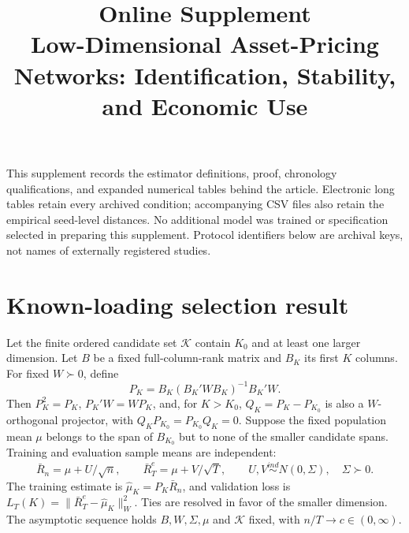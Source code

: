 \documentclass[11pt]{article}
\title{Online Supplement\\[6pt]\large Low-Dimensional Asset-Pricing Networks: Identification, Stability, and Economic Use}
\author{}
\date{}
\begin{document}
\maketitle
\vspace{-2em}
This supplement records the estimator definitions, proof, chronology qualifications, and expanded numerical tables behind the article. Electronic long tables retain every archived condition; accompanying CSV files also retain the empirical seed-level distances. No additional model was trained or specification selected in preparing this supplement. Protocol identifiers below are archival keys, not names of externally registered studies.

\section{Known-loading selection result}
\setcounter{equation}{0}
Let the finite ordered candidate set $\mathcal K$ contain $K_0$ and at least one larger dimension. Let $B$ be a fixed full-column-rank matrix and $B_K$ its first $K$ columns. For fixed $W\succ0$, define
\begin{equation}
P_K=B_K(B_K'WB_K)^{-1}B_K'W.
\end{equation}
Then $P_K^2=P_K$, $P_K'W=WP_K$, and, for $K>K_0$, $Q_K=P_K-P_{K_0}$ is also a $W$-orthogonal projector, with $Q_KP_{K_0}=P_{K_0}Q_K=0$. Suppose the fixed population mean $\mu$ belongs to the span of $B_{K_0}$ but to none of the smaller candidate spans. Training and evaluation sample means are independent:
\begin{equation}
\bar R_n=\mu+U/\sqrt n,\qquad \bar R_T^e=\mu+V/\sqrt T,
\qquad U,V\stackrel{ind}{\sim}N(0,\Sigma),\quad\Sigma\succ0.
\end{equation}
The training estimate is $\widehat\mu_K=P_K\bar R_n$, and validation loss is $L_T(K)=\|\bar R_T^e-\widehat\mu_K\|_W^2$. Ties are resolved in favor of the smaller dimension. The asymptotic sequence holds $B,W,\Sigma,\mu$ and $\mathcal K$ fixed, with $n/T\to c\in(0,\infty)$.
\end{document}
